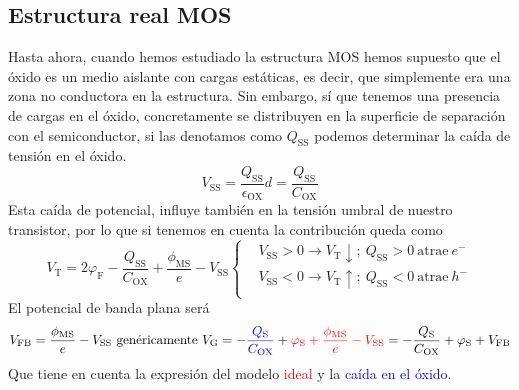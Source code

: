\subsection{Estructura real MOS}
Hasta ahora, cuando hemos estudiado la estructura MOS hemos supuesto que el óxido es un medio aislante con cargas estáticas, es decir, que simplemente era una zona no conductora en la estructura. Sin embargo, sí que tenemos una presencia de cargas en el óxido, concretamente se distribuyen en la superficie de separación con el semiconductor, si las denotamos como $Q_\mathrm{SS}$ podemos determinar la caída de tensión en el óxido.
\begin{equation}
V_\mathrm{SS}=\frac{Q_\mathrm{SS}}{\epsilon_\mathrm{OX}}d=\frac{Q_\mathrm{SS}}{C_\mathrm{OX}}
    \label{eq: Caida de tension en el oxido}
\end{equation}
Esta caída de potencial, influye también en la tensión umbral de nuestro transistor, por lo que si tenemos en cuenta la contribución queda como 
\begin{equation}
V_\mathrm{T}=2\varphi_\mathrm{F}-\frac{Q_\mathrm{SS}}{C_\mathrm{OX}}+\frac{\phi_\mathrm{MS}}{e}-V_\mathrm{SS} \left \{\begin{aligned}
    &V_\mathrm{SS}>0 \xrightarrow{} V_\mathrm{T} \downarrow; \ Q_\mathrm{SS}>0 \ \text{atrae} \ e^-\\
    &V_\mathrm{SS}<0 \xrightarrow{} V_\mathrm{T} \uparrow ; \ Q_\mathrm{SS}<0 \ \text{atrae} \ h^-\\
\end{aligned} \right.
\label{eq: tension umbral real}
\end{equation}
El potencial de banda plana será
\begin{equation}
    V_\mathrm{FB}=\frac{\phi_\mathrm{MS}}{e}-V_\mathrm{SS} \ \text{genéricamente} \ V_\mathrm{G}=\textcolor{blue}{-\frac{Q_\mathrm{S}}{C_\mathrm{OX}}}+ \textcolor{red}{\varphi_\mathrm{S}+ \frac{\phi_\mathrm{MS}}{e}-V_\mathrm{SS}}= -\frac{Q_\mathrm{S}}{C_\mathrm{OX}}+ \varphi_\mathrm{S}+V_\mathrm{FB}
\end{equation}
Que tiene en cuenta la expresión del modelo \textcolor{red}{ideal} y la \textcolor{blue}{caída en el óxido}.
